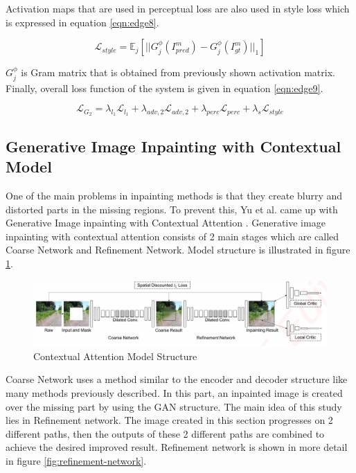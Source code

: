 Activation maps that are used in perceptual loss are also used in style loss which is expressed in equation \ref{eqn:edge8}.

\begin{equation}
\label{eqn:edge8}
    \mathcal{L}_{style} = \mathbb{E}_j [ || G_j^{\phi} (I^m_{pred})- G_j^{\phi} (I^m_{gt}) ||_1 ]
\end{equation}

\(G_j^\phi\) is Gram matrix that is obtained from previously shown activation matrix. Finally, overall loss function of the system is given in equation \ref{eqn:edge9}.

\begin{equation}
\label{eqn:edge9}
    \mathcal{L}_{G_2}=\lambda_{l_1}\mathcal{L}_{l_1} + \lambda_{adv,2}\mathcal{L}_{adv,2} + \lambda_{perc}\mathcal{L}_{perc} + \lambda_{s}\mathcal{L}_{style}
\end{equation}

\subsection{Generative Image Inpainting with Contextual Model}

One of the main problems in inpainting methods is that they create blurry and distorted parts in the missing regions. To prevent this, Yu et al. came up with Generative Image inpainting with Contextual Attention \cite{generative_contextual}.
Generative image inpainting with contextual attention consists of 2 main stages which are called Coarse Network and Refinement Network. Model structure is illustrated in figure \ref{fig:contextual-structure}.

\begin{figure}[h]
    \centering
    \includegraphics[scale=0.4]{figures/chapter4/GenerativeOverview.PNG}
    \vspace*{3mm}
    \caption{Contextual Attention Model Structure \cite{generative_contextual}}
    \label{fig:contextual-structure}
\end{figure}

Coarse Network uses a method similar to the encoder and decoder structure like many methods previously described. In this part, an inpainted image is created over the missing part by using the GAN structure. \newline
The main idea of this study lies in Refinement network. The image created in this section progresses on 2 different paths, then the outputs of these 2 different paths are combined to achieve the desired improved result. Refinement network is shown in more detail in figure \ref{fig:refinement-network}.

